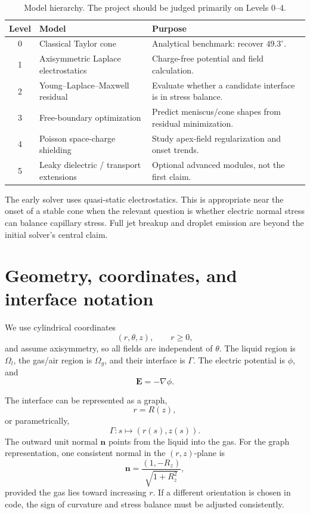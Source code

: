 \documentclass[11pt]{article}
\newcommand{\vE}{\mathbf{E}}
\newcommand{\vn}{\mathbf{n}}
\newcommand{\grad}{\nabla}
\begin{document}
\begin{table}[h]
\centering
\begin{tabularx}{\textwidth}{@{}c l X@{}}
\toprule
Level & Model & Purpose \\
\midrule
0 & Classical Taylor cone & Analytical benchmark: recover \(49.3^\circ\). \\
1 & Axisymmetric Laplace electrostatics & Charge-free potential and field calculation. \\
2 & Young--Laplace--Maxwell residual & Evaluate whether a candidate interface is in stress balance. \\
3 & Free-boundary optimization & Predict meniscus/cone shapes from residual minimization. \\
4 & Poisson space-charge shielding & Study apex-field regularization and onset trends. \\
5 & Leaky dielectric / transport extensions & Optional advanced modules, not the first claim. \\
\bottomrule
\end{tabularx}
\caption{Model hierarchy. The project should be judged primarily on Levels 0--4.}
\end{table}

The early solver uses quasi-static electrostatics. This is appropriate near the onset of a stable cone when the relevant question is whether electric normal stress can balance capillary stress. Full jet breakup and droplet emission are beyond the initial solver's central claim.

\section{Geometry, coordinates, and interface notation}

We use cylindrical coordinates
\begin{equation}
    (r,\theta,z),\qquad r\ge 0,
\end{equation}
and assume axisymmetry, so all fields are independent of \(\theta\). The liquid region is \(\Omega_l\), the gas/air region is \(\Omega_g\), and their interface is \(\Gamma\). The electric potential is \(\phi\), and
\begin{equation}
    \vE = -\grad\phi.
\end{equation}

The interface can be represented as a graph,
\begin{equation}
    r=R(z),
\end{equation}
or parametrically,
\begin{equation}
    \Gamma: s\mapsto (r(s),z(s)).
\end{equation}
The outward unit normal \(\vn\) points from the liquid into the gas. For the graph representation, one consistent normal in the \((r,z)\)-plane is
\begin{equation}
    \vn = \frac{(1,-R_z)}{\sqrt{1+R_z^2}},
\end{equation}
provided the gas lies toward increasing \(r\). If a different orientation is chosen in code, the sign of curvature and stress balance must be adjusted consistently.
\end{document}
